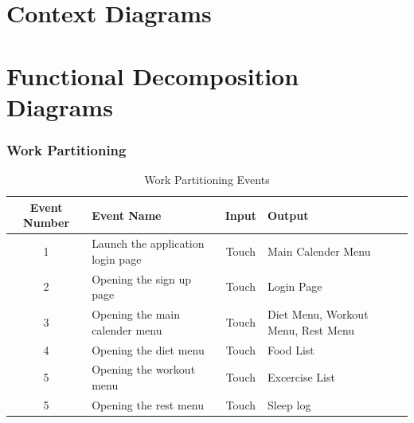 \documentclass[12pt,letterpaper]{article}
\begin{document}
\section{Context Diagrams}

\section{Functional Decomposition Diagrams}

\subsubsection{Work Partitioning}
\begin{table}[h!]
\caption{Work Partitioning Events}
    \centering
    \begin{tabular}{|c|p{3.5cm}|c|p{3.5cm}|}
    \hline
    \textbf{Event Number} & \centering\textbf{Event Name} & \textbf{Input} & \textbf{Output} \\
    \hline
    1 & Launch the application login page & Touch & Main Calender Menu \\
    \hline
    2 & Opening the sign up page & Touch & Login Page \\
    \hline
    3 & Opening the main calender menu & Touch & Diet Menu, Workout Menu, Rest Menu \\
    \hline
    4 & Opening the diet menu  & Touch & Food List \\
    \hline
    5 & Opening the workout menu & Touch & Excercise List \\
    \hline
    5 & Opening the rest menu & Touch & Sleep log \\
    \hline
    \end{tabular}
\end{table}
\end{document}
